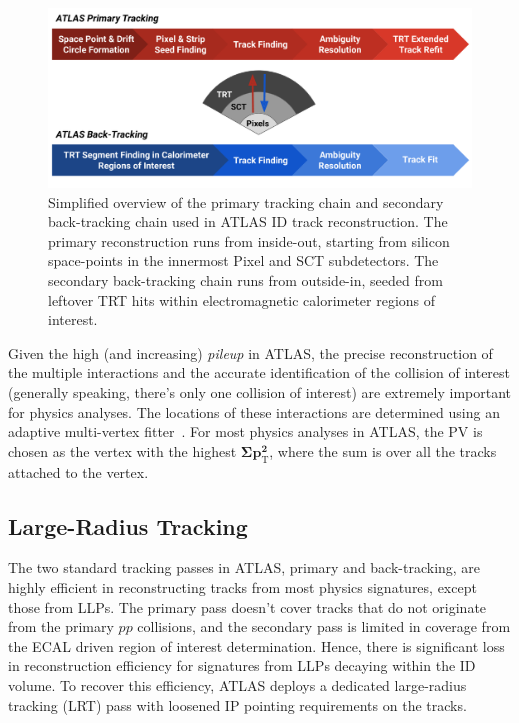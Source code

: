\begin{figure}[!ht]
    \centering
    \includegraphics[width=0.8\linewidth]{figures//experiment/trackingSteps.png}
    \caption{Simplified overview of the primary tracking chain and secondary back-tracking chain used in ATLAS ID track reconstruction. The primary reconstruction runs from inside-out, starting from silicon space-points in the innermost Pixel and SCT subdetectors. The secondary back-tracking chain runs from outside-in, seeded from leftover TRT hits within electromagnetic calorimeter regions of interest.~\cite{atlascollaboration2023software}}
    \label{fig:track-steps}
\end{figure}

Given the high (and increasing) \textit{pileup} in ATLAS, the precise reconstruction of the multiple interactions and the accurate identification of the collision of interest (generally speaking, there's only one collision of interest) are extremely important for physics analyses. The locations of these interactions are determined using an adaptive multi-vertex fitter~\cite{Waltenberger_2007}. For most physics analyses in ATLAS, the PV is chosen as the vertex with the highest $\boldsymbol{\Sigma p_\mathrm{T}^2}$, where the sum is over all the tracks attached to the vertex.

\subsection{Large-Radius Tracking}
The two standard tracking passes in ATLAS, primary and back-tracking, are highly efficient in reconstructing tracks from most physics signatures, except those from LLPs. The primary pass doesn't cover tracks that do not originate from the primary $pp$ collisions, and the secondary pass is limited in coverage from the ECAL driven region of interest determination. Hence, there is significant loss in reconstruction efficiency for signatures from LLPs decaying within the ID volume. To recover this efficiency, ATLAS deploys a dedicated large-radius tracking (LRT) pass with loosened IP pointing requirements on the tracks. 


